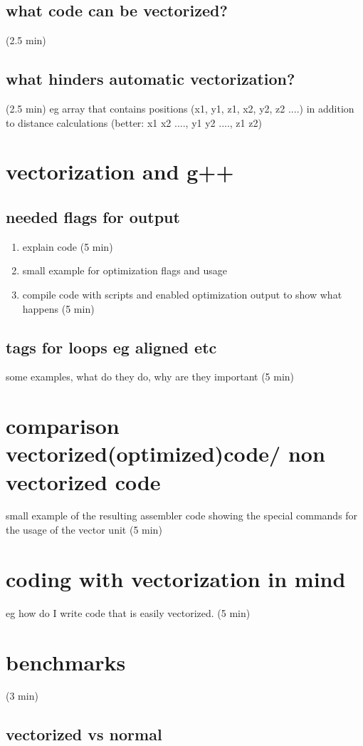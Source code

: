 \documentclass[12pt,titlepage]{article}
\begin{document}
\subsection{what code can be vectorized?} (2.5 min)
\subsection{what hinders automatic vectorization?}(2.5 min)
    eg array that contains positions (x1, y1, z1, x2, y2, z2 ....) in addition to distance
    calculations (better: x1 x2 ...., y1 y2 ...., z1 z2) 
\section{vectorization and g++}
\subsection{needed flags for output}
\begin{enumerate}[noitemsep]
    \item explain code (5 min)
    \item small example for optimization flags and usage
    \item compile code with scripts and enabled optimization output to show what happens (5 min)
\end{enumerate} 
\subsection{tags for loops eg aligned etc}
some examples, what do they do, why are they important (5 min)

\section{comparison vectorized(optimized)code/ non vectorized code}
    small example of the resulting assembler code showing the special commands for the usage of the
    vector unit  (5 min)
\section{coding with vectorization in mind}
eg how do I write code that is easily vectorized. (5 min)
\section{benchmarks}
(3 min)
    \subsection{vectorized vs normal}
\end{document}
